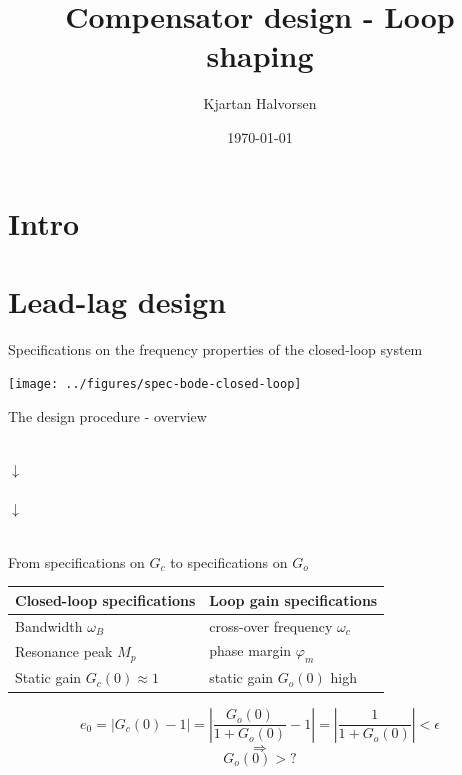 \documentclass[presentation,aspectratio=169, usenames, dvipsnames]{beamer}
\author{Kjartan Halvorsen}
\date{\today}
\title{Compensator design - Loop shaping}
\begin{document}
\maketitle

\section{Intro}
\label{sec:org3c4ee42}

\section{Lead-lag design}
\label{sec:org86be95f}

\begin{frame}[label={sec:org8d54ba2}]{Specifications on the frequency properties of the closed-loop system}
\begin{center}
\texttt{[image: ../figures/spec-bode-closed-loop]}
\end{center}
\end{frame}

\begin{frame}[label={sec:org6ae2acf}]{The design procedure - overview}
\begin{center}
\\
\(\downarrow\)\\
\\
\(\downarrow\)\\
\\
\end{center}
\end{frame}

\begin{frame}[label={sec:orgb445bfc}]{From specifications on \(G_c\) to specifications on \(G_o\)}
\begin{center}
\begin{center}
\begin{tabular}{ll}
Closed-loop specifications & Loop gain specifications\\
\hline
Bandwidth \(\omega_B\) & cross-over frequency \(\omega_c\)\\
Resonance peak \(M_p\) & phase margin \(\varphi_m\)\\
Static gain \(G_c(0) \approx 1\) & static gain \(G_o(0)\) high\\
\hline
\end{tabular}
\end{center}
\end{center}


\[ e_0 = |G_c(0)-1| = \left|\frac{G_o(0)}{1+G_o(0)}-1\right| = \left|\frac{1}{1+G_o(0)}\right| < \epsilon\] \[\Rightarrow\]  \[G_o(0) > ?\]
\end{frame}
\end{document}
